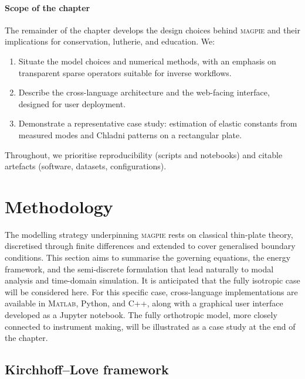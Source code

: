 \paragraph{Scope of the chapter}
The remainder of the chapter develops the design choices behind \textsc{magpie} and their implications for conservation, lutherie, and education. We: 
\begin{enumerate}
\item Situate the model choices and numerical methods, with an emphasis on transparent sparse operators suitable for inverse workflows.
\item Describe the cross-language architecture and the web-facing interface, designed for user deployment.
\item Demonstrate a representative case study: estimation of elastic constants from measured modes and Chladni patterns on a rectangular plate. 
\end{enumerate}


Throughout, we prioritise reproducibility (scripts and notebooks) and citable artefacts (software, datasets, configurations).


\section{Methodology}\label{sec:methodology}

The modelling strategy underpinning \textsc{magpie} rests on classical thin-plate theory, discretised through finite differences and extended to cover generalised boundary conditions. This section aims to summarise the governing equations, the energy framework, and the semi-discrete formulation that lead naturally to modal analysis and time-domain simulation. It is anticipated that the fully isotropic case will be considered here. For this specific case, cross-language implementations are available in M\textsc{atlab}, Python, and C++, along with a graphical user interface developed as a Jupyter notebook. The fully orthotropic model, more closely connected to instrument making, will be illustrated as a case study at the end of the chapter. 

\subsection{Kirchhoff--Love framework}

